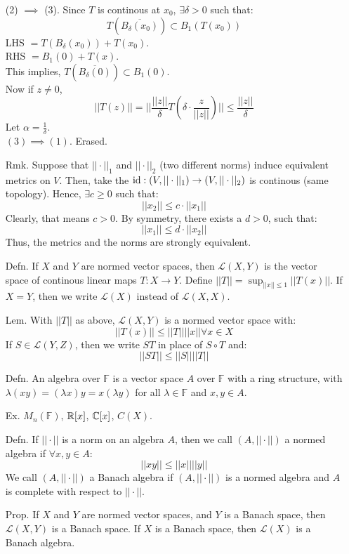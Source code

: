 \documentclass[12pt]{article}
\begin{document}
\begin{itemize}
    (2) $\implies$ (3). Since $T$ is continous at $x_0$, $\exists \delta > 0$ such that: 
    \[ T(\overline{B_\delta(x_0)}) \subset B_1(T(x_0))\]
    LHS $ = T(B_\delta(x_0)) + T(x_0)$. \\
    RHS $ = B_1(0) + T(x)$. \\
    This implies, $T(\overline{B_\delta(0)}) \subset B_1(0)$. \\
    Now if $z \neq 0$, 
    \[  ||T(z) || = || \frac{||z||}{\delta} T(\delta \cdot \frac{z}{||z||})|| \leq \frac{||z||}{\delta}\]
    Let $\alpha = \frac{1}{\delta}$. \\
    $(3) \implies (1)$. Erased. 
    \item[Rmk.] Suppose that $||\cdot||_1$ and $||\cdot ||_2$ (two different norms) induce equivalent metrics on $V$. Then, take the $\operatorname{id}: (V, ||\cdot||_1) \to (V, ||\cdot||_2)$ is continous (same topology). Hence, $\exists c \geq 0$ such that: 
    \[ ||x_2|| \leq c \cdot ||x_1||\]  
    Clearly, that means $c > 0$. By symmetry, there exists a $d > 0$, such that:
    \[ ||x_1|| \leq d \cdot ||x_2||\]
    Thus, the metrics and the norms are strongly equivalent.
    \item[Defn.] If $X$ and $Y$ are normed vector spaces, then $\mathcal{L}(X, Y)$ is the vector space of continous linear maps $T: X \to Y$. Define $||T|| = \sup_{||x|| \leq 1} ||T(x)||$. If $X = Y$, then we write $\mathcal{L}(X)$ instead of $\mathcal{L}(X, X)$.
    \item[Lem.] With $||T||$ as above, $\mathcal{L}(X,Y)$ is a normed vector space with:
    \[ ||T(x)|| \leq ||T||||x|| \forall x \in X\]
    If $S \in \mathcal{L}(Y, Z)$, then we write $ST$ in place of $S \circ T$ and: 
    \[ ||ST|| \leq ||S||||T||\]
    \item[Defn.] An algebra over $\mathbb{F}$ is a vector space $A$ over $\mathbb{F}$ with a ring structure, with $\lambda(xy) = (\lambda x)y = x(\lambda y)$ for all $\lambda \in \mathbb{F}$ and $x, y \in A$.
    \item[Ex. ] $M_n(\mathbb{F})$, $\mathbb R[x]$, $\mathbb C[x]$, $C(X)$. 
    \item[Defn.] If $||\cdot||$ is a norm on an algebra $A$, then we call $(A, ||\cdot||)$ a normed algebra if $\forall x,y \in A$: 
    \[ ||xy|| \leq ||x||||y|| \]
    We call $(A, ||\cdot||)$ a Banach algebra if $(A, ||\cdot||)$ is a normed algebra and $A$ is complete with respect to $||\cdot||$.
    \item[Prop.] If $X$ and $Y$ are normed vector spaces, and $Y$ is a Banach space, then $\mathcal{L}(X,Y)$ is a Banach space. If $X$ is a Banach space, then $\mathcal{L}(X)$ is a Banach algebra. \\

\end{itemize}
\end{document}
